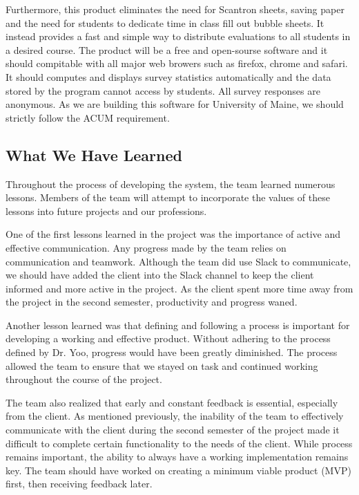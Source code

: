 \documentclass{article}
\begin{document}
Furthermore, this product eliminates the need for Scantron sheets, saving paper and the need for students to dedicate time in class fill out bubble sheets. It instead provides a fast and simple way to distribute evaluations to all students in a desired course. The product will be a free and open-sourse software and it should compitable with all major web browers such as firefox, chrome and safari. It should computes and displays survey statistics automatically and the data stored by the program cannot access by students. All survey responses are anonymous. As we are building this software for University of Maine, we should strictly follow the ACUM requirement.

\subsection{What We Have Learned}

Throughout the process of developing the system, the team learned numerous lessons. Members of the team will attempt to incorporate the values of these lessons into future projects and our professions. 

One of the first lessons learned in the project was the importance of active and effective communication. Any progress made by the team relies on communication and teamwork. Although the team did use Slack to communicate, we should have added the client into the Slack channel to keep the client informed and more active in the project. As the client spent more time away from the project in the second semester, productivity and progress waned.

Another lesson learned was that defining and following a process is important for developing a working and effective product. Without adhering to the process defined by Dr. Yoo, progress would have been greatly diminished. The process allowed the team to ensure that we stayed on task and continued working throughout the course of the project. 

The team also realized that early and constant feedback is essential, especially from the client. As mentioned previously, the inability of the team to effectively communicate with the client during the second semester of the project made it difficult to complete certain functionality to the needs of the client. While process remains important, the ability to always have a working implementation remains key. The team should have worked on creating a minimum viable product (MVP) first, then receiving feedback later. 
\end{document}
